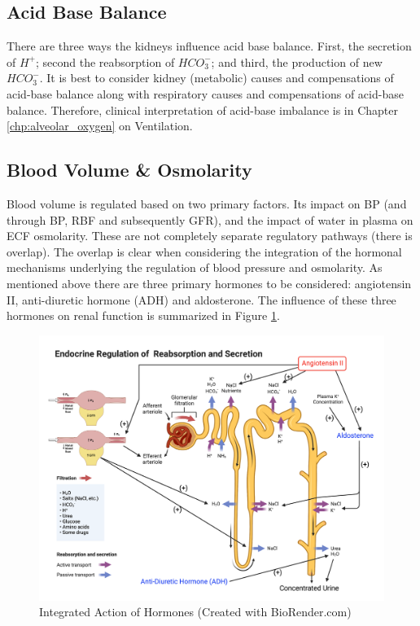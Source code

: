 \subsection{Acid Base Balance}
There are three ways the kidneys influence acid base balance. First, the secretion of $H^+$; second the reabsorption of $HCO_3^-$; and third, the production of new $HCO_3^-$. It is best to consider kidney (metabolic) causes and compensations of acid-base balance along with respiratory causes and compensations of acid-base balance. Therefore, clinical interpretation of acid-base imbalance is in Chapter \ref{chp:alveolar_oxygen} on Ventilation.


\subsection{Blood Volume \& Osmolarity}

Blood volume is regulated based on two primary factors. Its impact on BP (and through BP, RBF and subsequently GFR), and the impact of water in plasma on ECF osmolarity. These are not completely separate regulatory pathways (there is overlap). The overlap is clear when considering the integration of the hormonal mechanisms underlying the regulation of blood pressure and osmolarity. As mentioned above there are three primary hormones to be considered: angiotensin II, anti-diuretic hormone (ADH) and aldosterone. The influence of these three hormones on renal function is summarized in Figure \ref{fig:Endocrine_Regulation}.

\begin{figure}[!h]
    \centering
    \includegraphics[width=1\linewidth]{./figure/Endocrine_Regulation.png}
    \caption{Integrated Action of Hormones \footnotesize{(Created with BioRender.com)}}
    \label{fig:Endocrine_Regulation}
\end{figure}

